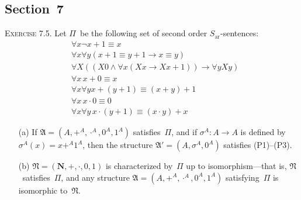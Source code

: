 \documentclass[letterpaper]{article}
\newcommand{\N}{\mathbf{N}}
\newcommand{\lequ}{\equiv}
\newcommand{\limp}{\rightarrow}
\theoremstyle{remark}
\begin{document}
\subsection*{Section~7}
\noindent\textsc{Exercise 7.5.}
Let $\Pi$~be the following set of second order $S_\text{ar}$-sentences:
\begin{align*}
&\forall x\lnot x+1\lequ x\\
&\forall x\forall y(x+1\lequ y+1\limp x\lequ y)\\
&\forall X((X0\land\forall x(Xx\limp Xx+1))\limp\forall y Xy)\\
&\forall x\,x+0\lequ x\\
&\forall x\forall y x+(y+1)\lequ(x+y)+1\\
&\forall x\,x\cdot0\lequ0\\
&\forall x\forall y\,x\cdot(y+1)\lequ(x\cdot y)+x
\end{align*}
\begin{enumerate}
\item[(a)] If $\mathfrak{A}=(A,+^A,\cdot^A,0^A,1^A)$ satisfies~$\Pi$, and if $\sigma^A:A\to A$ is defined by $\sigma^A(x)=x+^A1^A$, then the structure $\mathfrak{A}'=(A,\sigma^A,0^A)$ satisfies (P1)--(P3).
\item[(b)] $\mathfrak{N}=(\N,+,\cdot,0,1)$ is characterized by~$\Pi$ up to isomorphism---that is, $\mathfrak{N}$~satisfies~$\Pi$, and any structure $\mathfrak{A}=(A,+^A,\cdot^A,0^A,1^A)$ satisfying~$\Pi$ is isomorphic to~$\mathfrak{N}$.
\end{enumerate}
\end{document}
